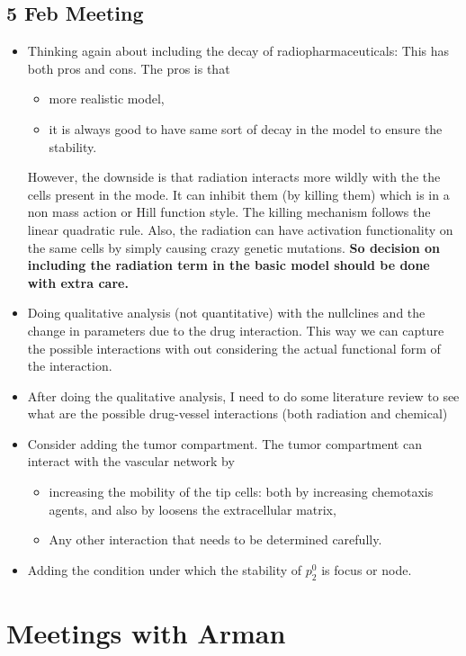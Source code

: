 \subsection{5 Feb Meeting}
\begin{itemize}[itemsep=0pt, parsep=0pt]
	\item Thinking again about including the decay of radiopharmaceuticals: This has both pros and cons. The pros is that 
	\begin{itemize}[itemsep=0pt, parsep=0pt]
		\item more realistic model,
		\item it is always good to have same sort of decay in the model to ensure the stability.
	\end{itemize}
	However, the downside is that radiation interacts more wildly with the the cells present in the mode. It can inhibit them (by killing them) which is in a non mass action or Hill function style. The killing mechanism follows the linear quadratic rule. Also, the radiation can have activation functionality on the same cells by simply causing crazy genetic mutations. \textbf{So decision on including the radiation term in the basic model should be done with extra care.}
	\item Doing qualitative analysis (not quantitative) with the nullclines and the change in parameters due to the drug interaction. This way we can capture the possible interactions with out considering the actual functional form of the interaction.
	\item After doing the qualitative analysis, I need to do some literature review to see what are the possible drug-vessel interactions (both radiation and chemical)
	\item Consider adding the tumor compartment. The tumor compartment can interact with the vascular network by
	\begin{itemize}[itemsep=0pt, parsep=0pt]
		\item increasing the mobility of the tip cells: both by increasing chemotaxis agents, and also by loosens the extracellular matrix,
		\item Any other interaction that needs to be determined carefully.
	\end{itemize}
	\item Adding the condition under which the stability of $p^0_2$ is focus or node.
\end{itemize}

\section{Meetings with Arman}